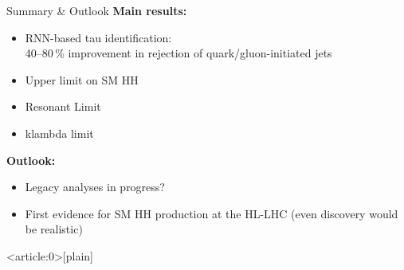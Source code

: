 \documentclass[11pt, xcolor={dvipsnames}, aspectratio=169, notes]{beamer}
\begin{document}
%


\begin{frame}{Summary \& Outlook}
  \textbf{Main results:}
  \begin{itemize}
  \item RNN-based tau identification:\\
    40--80\,\% improvement in rejection of quark/gluon-initiated jets

  \item Upper limit on SM HH

  \item Resonant Limit

  \item klambda limit
  \end{itemize}

  \textbf{Outlook:}
  \begin{itemize}
  \item Legacy analyses in progress?
  \item First evidence for SM HH production at the HL-LHC (even discovery would
    be realistic)
  \end{itemize}
\end{frame}


{ %
  \begin{frame}<article:0>[plain]
  \end{frame}
}
\end{document}
